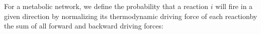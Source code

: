 For a metabolic network, we define the probability that a reaction $i$ will fire in a given direction by normalizing its thermodynamic driving force of each reactionby the sum of all forward and backward driving forces: